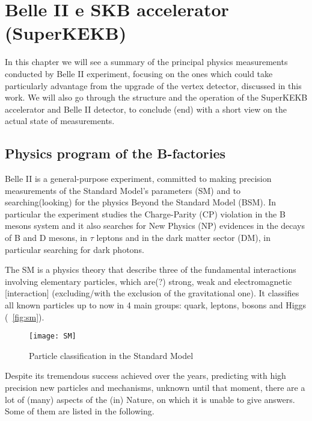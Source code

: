 
\chapter{Belle II e SKB accelerator (SuperKEKB)}

In this chapter we will see a summary of the principal physics measurements conducted by Belle II experiment, focusing on the ones which could take particularly advantage from the upgrade of the vertex detector, discussed in this work. We will also go through the structure and the operation of the SuperKEKB accelerator and Belle II detector, to conclude (end) with a short view on the actual state of measurements.


\section{Physics program of the B-factories}



Belle II is a general-purpose experiment, committed to making precision measurements of the Standard Model's parameters (SM) and to searching(looking) for the physics Beyond the Standard Model (BSM).
In particular the experiment studies the Charge-Parity (CP) violation in the B mesons system and it also searches for New Physics (NP) evidences in the decays of B and D mesons, in $\tau$ leptons and in the dark matter sector (DM), in particular searching for dark photons.


The SM is a physics theory that describe three of the fundamental interactions involving elementary particles, which are(?) strong, weak and electromagnetic [interaction] (excluding/with the exclusion of the gravitational one). It classifies all known particles up to now in 4 main groups: quark, leptons, bosons and Higgs (~\vref{fig:sm}).


\begin{figure}[h]
\centering
\texttt{[image: SM]}
\caption{Particle classification in the Standard Model}
\label{fig:sm}
\end{figure}

Despite its tremendous success achieved over the years, predicting with high precision new particles and mechanisms, unknown until that moment, there are a lot of (many) aspects of the (in) Nature, on which it is unable to give answers. Some of them are listed in the following.

